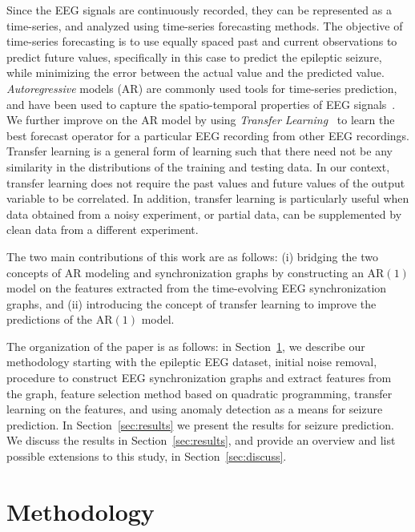 \documentclass{article} %
\theoremstyle{definition}
\theoremstyle{remark}
\begin{document}
Since the EEG signals are continuously recorded, they can be represented as a time-series, and analyzed using time-series forecasting methods.  The objective of time-series forecasting is to use equally spaced past and current observations to predict future values, specifically in this case to predict the epileptic seizure, while minimizing the error between the actual value and the predicted value.  {\em Autoregressive} models (AR) are commonly used tools for time-series prediction, and have been used to capture the spatio-temporal properties of  EEG signals~\cite{anderson_offline_ar,subasi_EEG_AR}.  We further improve on the AR model by using {\em Transfer Learning}~\cite{transfer_learning_survey} to learn the best forecast operator for a particular EEG recording from other EEG recordings.  Transfer learning is a general form of learning such that there need not be any similarity in the distributions of the training and testing data.  In our context, transfer learning does not require the past values and future values of the output variable to be correlated.  In addition, transfer learning is particularly useful when data obtained from a noisy experiment, or partial data, can be supplemented by clean data from a different experiment.

The two main contributions of this work are as follows: (i) bridging the two concepts of AR modeling and synchronization graphs by constructing an AR$(1)$ model on the features extracted from the time-evolving EEG synchronization graphs,  and (ii) introducing the concept of transfer learning to improve the predictions of the AR$(1)$ model.

The organization of the paper is as follows: in Section~\ref{sec:method}, we describe our methodology starting with the epileptic EEG dataset, initial noise removal, procedure to construct EEG synchronization graphs and extract features from the graph, feature selection method based on quadratic programming, transfer learning on the features, and using anomaly detection as a means for seizure prediction.  In Section~\ref{sec:results} we present the results for seizure prediction.  We discuss the results in Section~\ref{sec:results}, and provide an overview and list possible extensions to this study, in Section~\ref{sec:discuss}.

\section{Methodology} \label{sec:method}
\end{document}
